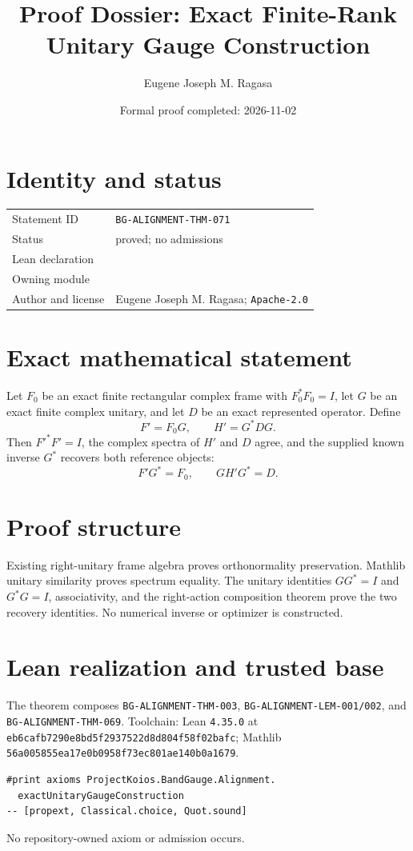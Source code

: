 \documentclass[10pt]{article}
\title{Proof Dossier: Exact Finite-Rank Unitary Gauge Construction}
\author{Eugene Joseph M. Ragasa}
\date{Formal proof completed: 2026-11-02}
\begin{document}
\raggedright
\maketitle

\section{Identity and status}
\begin{tabularx}{\textwidth}{@{}lY@{}}
\toprule
Statement ID & \texttt{BG-ALIGNMENT-THM-071} \\
Status & proved; no admissions \\
Lean declaration &  \\
Owning module &  \\
Author and license & Eugene Joseph M. Ragasa; \texttt{Apache-2.0} \\
\bottomrule
\end{tabularx}

\section{Exact mathematical statement}
Let $F_0$ be an exact finite rectangular complex frame with $F_0^*F_0=I$, let $G$ be an exact
finite complex unitary, and let $D$ be an exact represented operator. Define
\[
 F'=F_0G,\qquad H'=G^*DG.
\]
Then $F'^*F'=I$, the complex spectra of $H'$ and $D$ agree, and the supplied known inverse $G^*$
recovers both reference objects:
\[
 F'G^*=F_0,\qquad G H'G^*=D.
\]

\section{Proof structure}
Existing right-unitary frame algebra proves orthonormality preservation. Mathlib unitary similarity
proves spectrum equality. The unitary identities $GG^*=I$ and $G^*G=I$, associativity, and the
right-action composition theorem prove the two recovery identities. No numerical inverse or
optimizer is constructed.

\section{Lean realization and trusted base}
The theorem composes \texttt{BG-ALIGNMENT-THM-003},
\texttt{BG-ALIGNMENT-LEM-001/002}, and \texttt{BG-ALIGNMENT-THM-069}. Toolchain: Lean \texttt{4.35.0} at
\texttt{eb6cafb7290e8bd5f2937522d8d804f58f02bafc}; Mathlib
\texttt{56a005855ea17e0b0958f73ec801ae140b0a1679}.
\begin{verbatim}
#print axioms ProjectKoios.BandGauge.Alignment.
  exactUnitaryGaugeConstruction
-- [propext, Classical.choice, Quot.sound]
\end{verbatim}
No repository-owned axiom or admission occurs.
\end{document}

